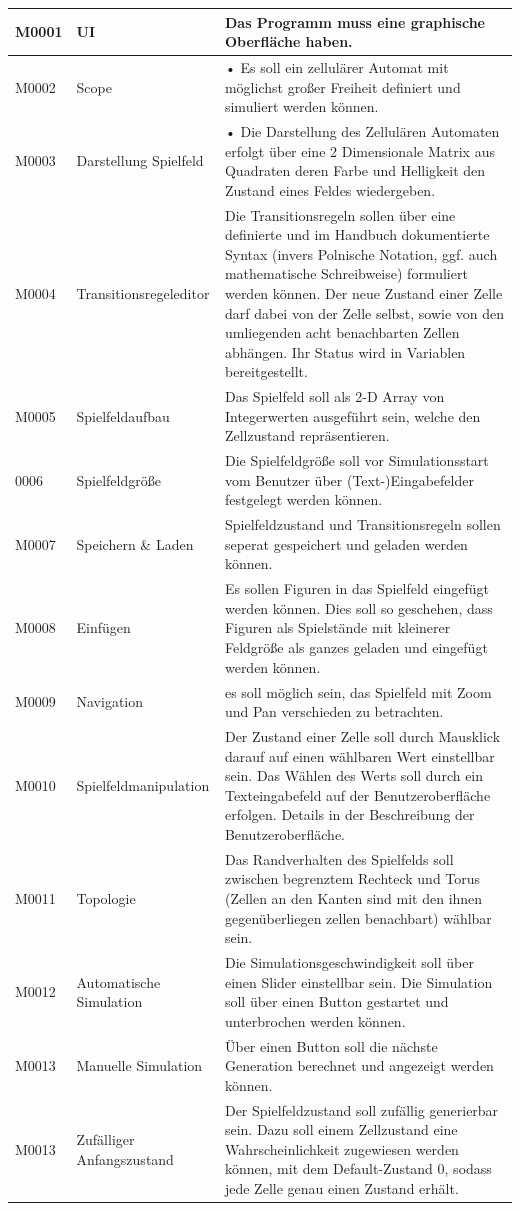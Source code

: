 \documentclass[11pt]{article}
\begin{document}
\begin{longtable}[m]{|m{2.2cm}|m{4cm}|m{8cm}|}
\hline
M0001     & UI & Das Programm muss eine graphische Oberfläche haben.  \\
\hline
M0002 & Scope & •   Es soll ein zellulärer Automat mit möglichst großer Freiheit definiert und simuliert werden können.  \\
\hline
M0003 & Darstellung Spielfeld & •   Die Darstellung des Zellulären Automaten erfolgt über eine 2 Dimensionale Matrix aus Quadraten deren Farbe und Helligkeit den Zustand eines Feldes wiedergeben. \\
\hline
M0004 & Transitionsregeleditor & Die Transitionsregeln sollen über eine definierte und im Handbuch dokumentierte Syntax (invers Polnische Notation, ggf. auch mathematische Schreibweise) formuliert werden können. Der neue Zustand einer Zelle darf dabei von der Zelle selbst, sowie von den umliegenden acht benachbarten Zellen abhängen. Ihr Status wird in Variablen bereitgestellt.\\
\hline
M0005 & Spielfeldaufbau & Das Spielfeld soll als 2-D Array von Integerwerten ausgeführt sein, welche den Zellzustand repräsentieren.\\
\hline
0006 & Spielfeldgröße & Die Spielfeldgröße soll vor Simulationsstart vom Benutzer über (Text-)Eingabefelder festgelegt werden können.\\
\hline
M0007 & Speichern \& Laden & Spielfeldzustand und Transitionsregeln sollen seperat gespeichert und geladen werden können.  \\
\hline
M0008 & Einfügen & Es sollen Figuren in das Spielfeld eingefügt werden können. Dies soll so geschehen, dass Figuren als Spielstände mit kleinerer Feldgröße als ganzes geladen und eingefügt werden können. \\
\hline
M0009 & Navigation & es soll möglich sein, das Spielfeld mit Zoom und Pan verschieden zu betrachten. \\
\hline
M0010 & Spielfeldmanipulation & Der Zustand einer Zelle soll durch Mausklick darauf auf einen wählbaren Wert einstellbar sein. Das Wählen des Werts soll durch ein Texteingabefeld auf der Benutzeroberfläche erfolgen. Details in der Beschreibung der Benutzeroberfläche.\\
\hline
M0011 & Topologie & Das Randverhalten des Spielfelds soll zwischen begrenztem Rechteck und Torus (Zellen an den Kanten sind mit den ihnen gegenüberliegen zellen benachbart) wählbar sein.\\
\hline
M0012 & Automatische Simulation & Die Simulationsgeschwindigkeit soll über einen Slider einstellbar sein. Die Simulation soll über einen Button gestartet und unterbrochen werden können.\\
\hline
M0013 & Manuelle Simulation & Über einen Button soll die nächste Generation berechnet und angezeigt werden können. \\
\hline
M0013 & Zufälliger Anfangszustand & Der Spielfeldzustand soll zufällig generierbar sein. Dazu soll einem Zellzustand eine Wahrscheinlichkeit zugewiesen werden können, mit dem Default-Zustand 0, sodass jede Zelle genau einen Zustand erhält.\\


\end{longtable}
\end{document}

